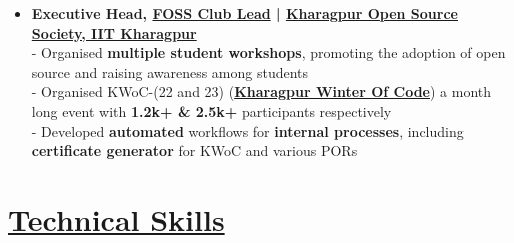 \documentclass[a4paper,10pt]{extarticle} %
\begin{document}
\begin{itemize}[leftmargin=0.55cm, rightmargin=0.2cm, label={\Large\textbullet}]
\item \textbf{Executive Head, \href{https://fossunited.org/clubs}{\textbf{FOSS Club Lead}} | \href{https://kossiitkgp.org}{Kharagpur Open Source Society, IIT Kharagpur}}\\
- Organised \textbf{multiple student workshops}, promoting the adoption of open source and raising awareness among students \\
- Organised KWoC-(22 and 23) (\textbf{\href{https://kwoc.kossiitkgp.org/}{Kharagpur Winter Of Code}}) a month long event with \textbf{1.2k+ \& 2.5k+} participants respectively \\
- Developed \textbf{automated} workflows for \textbf{internal processes}, including \textbf{certificate generator} for KWoC and various PORs


\end{itemize}

 \vspace{+0.4cm} \section{\textcolor{primary}{\href{https://www.github.com/proffapt/bodhitree}{Technical Skills}}}

 \vspace{+0.2cm}
\end{document}
